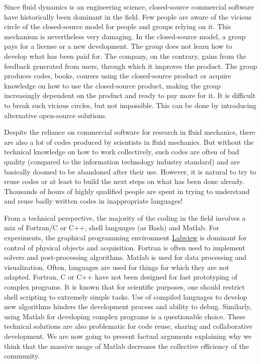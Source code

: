 Since fluid dynamics is an engineering science, closed-source commercial software
have historically been dominant in the field.
%
Few people are aware of the vicious circle of the closed-source model for people
and groups relying on it.
%
This mechanism is nevertheless very damaging. In the closed-source model, a group
pays for a license or a new development. The group does not learn how to develop
what has been paid for. The company, on the contrary, gains from
the feedback generated from users, through which it improves the product.
The group produces codes, books, courses using the closed-source product or
acquire knowledge on how to use the closed-source product, making the group
increasingly dependent on the product and ready to pay more for it.
%
It is difficult to break such vicious circles, but not impossible. This can be
done by introducing alternative open-source solutions.

Despite the reliance on commercial software for research in fluid mechanics,
%
there are also a lot of codes produced by scientists in fluid mechanics. But
without the technical knowledge on how to work collectively, such codes
are often of bad quality (compared to the information technology
industry standard) and are basically doomed to be abandoned after their use.
%
However, it is natural to try to reuse codes or at least to build the next steps
on what has been done already. Thousands of hours of highly qualified people
are spent in trying to understand and reuse badly written codes in
inappropriate languages!

From a technical perspective, the majority of the coding in the field involves
a mix of Fortran/C or C++, shell languages (as Bash) and Matlab. For
experiments, the graphical programming environment
\href{http://www.ni.com/en-us/shop/labview.html}{Labview} is dominant for
control of physical objects and acquisition. Fortran is often used to implement
solvers and post-processing algorithms. Matlab is used for data processing and
visualization.
%
Often, languages are used for things for which they are not adapted.
%
Fortran, C or C++ have not been designed for fast prototyping of complex
programs.
%
It is known that for scientific purposes, one should restrict shell scripting
to extremely simple tasks.
%
Use of compiled languages to develop new algorithms hinders the development
process and ability to debug.
%
Similarly, using Matlab for developing complex programs is a questionable
choice.
%
These technical solutions are also problematic for code reuse, sharing and
collaborative development.
%
We are now going to present factual arguments explaining why we think that the
massive usage of Matlab decreases the collective efficiency of the community.

